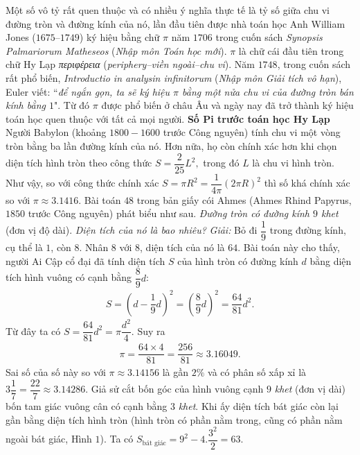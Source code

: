 \begin{multicols}{2}
	Một số vô tỷ rất quen thuộc và có nhiều ý nghĩa thực tế là tỷ số giữa chu vi đường tròn và đường kính của nó, lần đầu tiên được nhà toán học Anh William Jones ($1675–1749$) ký hiệu bằng chữ $\pi$  năm $1706$  trong cuốn sách \textit{Synopsis Palmariorum Matheseos} (\textit{Nhập môn Toán học mới}).  $\pi$ là chữ cái đầu tiên trong chữ Hy Lạp \textit{περιφέρεια} (\textit{periphery--viền ngoài--chu vi}). Năm $1748$, trong cuốn sách rất phổ biến, \textit{Introductio in analysin infinitorum} (\textit{Nhập môn Giải tích vô hạn}), Euler viết: ``\textit{để ngắn gọn, ta sẽ ký hiệu $\pi$ bằng một nửa chu vi của đường tròn bán kính bằng $1$}". Từ đó $\pi$ được phổ biến ở châu Âu và ngày nay đã trở thành ký hiệu toán học quen thuộc với tất cả mọi người.
	\vskip 0.1cm
	\textbf{\color{lichsutoanhoc}Số Pi trước toán học Hy Lạp}
	\vskip 0.1cm
	Người Babylon (khoảng $1800-1600$ trước Công nguyên) tính chu vi một vòng tròn bằng ba lần đường kính của nó. Hơn nữa, họ còn chính xác hơn khi chọn diện tích hình tròn theo công thức $S = \dfrac{2}{{25}}{L^2},$  trong đó $L$  là chu vi hình tròn. Như vậy, so với công thức chính xác $S = \pi {R^2} = \dfrac{1}{{4\pi }}{\left( {2\pi R} \right)^2}$  thì số  khá chính xác so với $\pi  \approx 3.1416$.
	\vskip 0.1cm
	Bài toán $48$ trong bản giấy cói Ahmes (Ahmes Rhind Papyrus, $1850$ trước Công nguyên) phát biểu như sau. \textit{Đường tròn có đường kính $9$ khet} (đơn vị độ dài). \textit{Diện tích của nó là bao nhiêu?}
	\vskip 0.1cm
	\textit{Giải:} Bỏ đi $\dfrac{1}{9}$ trong đường kính, cụ thể là $1$, còn $8$. Nhân $8$ với $8$, diện tích của nó là $64$.
	\vskip 0.1cm 
	Bài toán này cho thấy, người Ai Cập cổ đại đã tính diện tích  $S$ của hình tròn có đường kính $d$ bằng diện tích hình vuông có cạnh bằng $\dfrac{8}{9}d$: 
	\setlength{\abovedisplayskip}{5pt}
	\setlength{\belowdisplayskip}{5pt}
	\begin{align*}
		S = {\left( {d - \dfrac{1}{9}d} \right)^2} = {\left( {\dfrac{8}{9}d} \right)^2} = \dfrac{{64}}{{81}}{d^2}.
	\end{align*}
	Từ đây ta có  $S = \dfrac{{64}}{{81}}{d^2} = \pi \dfrac{{{d^2}}}{4}$. Suy ra
	\begin{align*}
		\pi  = \dfrac{{64 \times 4}}{{81}} = \dfrac{{256}}{{81}} \approx 3.16049.
	\end{align*}
	Sai số của số này so với  $\pi  \approx 3.14156$ là gần $2\%$ và có phân số xấp xỉ là $3\dfrac{1}{7} = \dfrac{{22}}{7} \approx 3.14286$.
	\vskip 0.1cm 
	Giả sử cắt bốn góc của hình vuông cạnh $9$ \textit{khet} (đơn vị dài) bốn tam giác vuông cân có cạnh bằng $3$ \textit{khet}. Khi ấy diện tích bát giác còn lại gần bằng diện tích hình tròn (hình tròn có phần nằm trong, cũng có phần nằm ngoài bát giác, Hình $1$). Ta có ${S_{{\text{bát giác}}}} = {9^2} - 4.\dfrac{{{3^2}}}{2} = 63.$   

\end{multicols}
